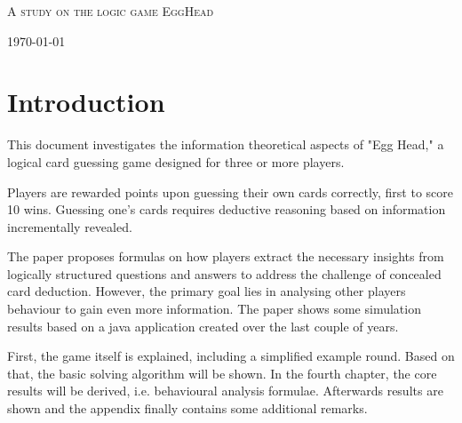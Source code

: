 \documentclass{article}
\begin{document}
\begin{titlepage}
\author{Marvin Zorn}

\begin{flushleft}
\vspace{200mm}
\end{flushleft}

\begin{center}
\huge
\textsc{A study on the logic game EggHead}\\

\end{center}

\normalsize

\vspace{170mm}


\begin{center}
\textnormal{\today}
\end{center}

\end{titlepage}

\newpage

\tableofcontents

\newpage

\section{Introduction}

This document investigates the information theoretical aspects of "Egg Head," a logical card guessing game designed for three or more players. 

Players are rewarded points upon guessing their own cards correctly, first to score 10 wins. Guessing one's cards requires deductive reasoning based on information incrementally revealed. 

The paper proposes formulas on how players extract the necessary insights from logically structured questions and answers to address the challenge of concealed card deduction. However, the primary goal lies in analysing other players behaviour to gain even more information. The paper shows some simulation results based on a java application created over the last couple of years.

First, the game itself is explained, including a simplified example round. Based on that, the basic solving algorithm will be shown. In the fourth chapter, the core results will be derived, i.e. behavioural analysis formulae. Afterwards results are shown and the appendix finally contains some additional remarks.
\end{document}
